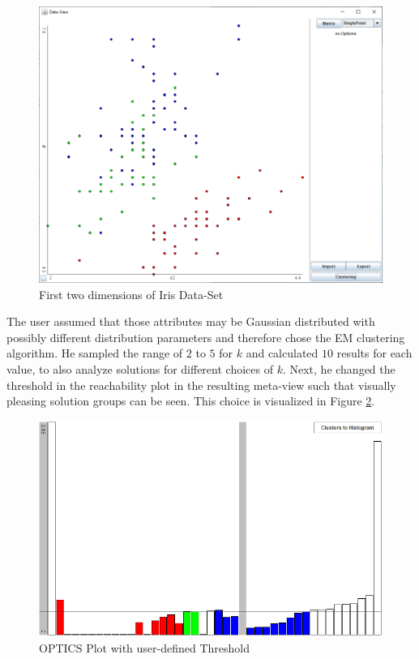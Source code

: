 \documentclass[
	a4paper,
	english,
	twoside,
	openright,               
	11pt                            
	]{report}
\begin{document}
\begin{figure}[h]
	\centering
	\includegraphics[scale=.4]{iris2}
	\caption{First two dimensions of Iris Data-Set}
	\label{fig:iris}
\end{figure}

The user assumed that those attributes may be Gaussian distributed with possibly different distribution parameters and therefore chose the EM clustering algorithm. He sampled the range of $2$ to $5$ for $k$ and calculated $10$ results for each value, to also analyze solutions for different choices of $k$. Next, he changed the threshold in the reachability plot in the resulting meta-view such that visually pleasing solution groups can be seen. This choice is visualized in Figure \ref{fig:user_iris_optics}.

\begin{figure}[h]
	\centering
	\includegraphics[scale=.4]{user_iris_optics}
	\caption{OPTICS Plot with user-defined Threshold}
	\label{fig:user_iris_optics}
\end{figure}
\end{document}
